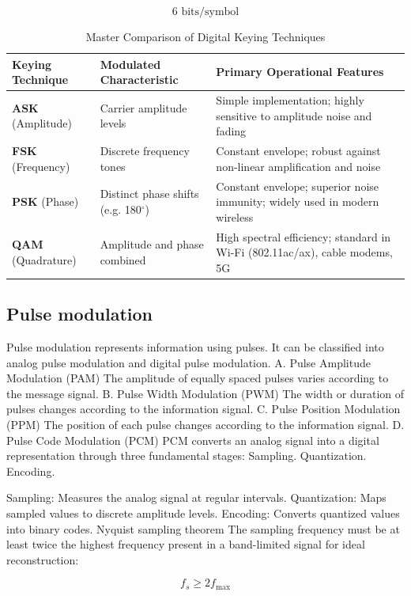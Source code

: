 \[
\boxed{6\text{ bits/symbol}}
\]

\begin{table}[htbp]
\centering
\caption{Master Comparison of Digital Keying Techniques}
\label{tab:digital_keying_comp}
\begin{tabularx}{\textwidth}{p{2.8cm} p{3.2cm} X}
\toprule
\textbf{Keying Technique} & \textbf{Modulated Characteristic} & \textbf{Primary Operational Features} \\
\midrule
\textbf{ASK} (Amplitude) & Carrier amplitude levels & Simple implementation; highly sensitive to amplitude noise and fading \\
\textbf{FSK} (Frequency) & Discrete frequency tones & Constant envelope; robust against non-linear amplification and noise \\
\textbf{PSK} (Phase) & Distinct phase shifts (e.g. 180$^\circ$) & Constant envelope; superior noise immunity; widely used in modern wireless \\
\textbf{QAM} (Quadrature) & Amplitude and phase combined & High spectral efficiency; standard in Wi-Fi (802.11ac/ax), cable modems, 5G \\
\bottomrule
\end{tabularx}
\end{table}
\subsection{Pulse modulation}
Pulse modulation represents information using pulses.
It can be classified into analog pulse modulation and digital pulse modulation.
A. Pulse Amplitude Modulation (PAM)
The amplitude of equally spaced pulses varies according to the message signal.
B. Pulse Width Modulation (PWM)
The width or duration of pulses changes according to the information signal.
C. Pulse Position Modulation (PPM)
The position of each pulse changes according to the information signal.
D. Pulse Code Modulation (PCM)
PCM converts an analog signal into a digital representation through three fundamental stages:
Sampling.
Quantization.
Encoding.


Sampling: Measures the analog signal at regular intervals.
Quantization: Maps sampled values to discrete amplitude levels.
Encoding: Converts quantized values into binary codes.
Nyquist sampling theorem
The sampling frequency must be at least twice the highest frequency present in a band-limited signal for ideal reconstruction:

\[
\boxed{f_s\geq2f_{\max}}
\]

